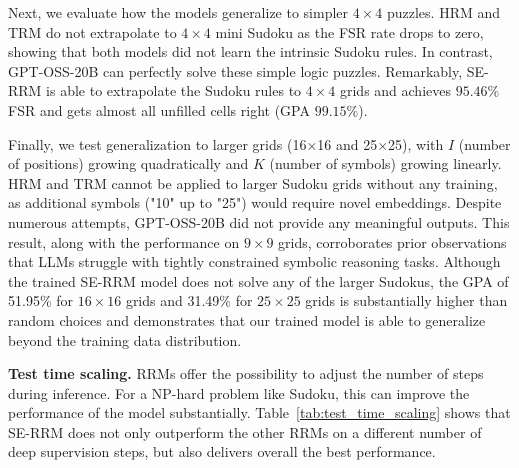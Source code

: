 \documentclass{article}
\theoremstyle{plain}
\theoremstyle{definition}
\theoremstyle{remark}
\renewcommand{\paragraph}[1]{\textbf{#1}\;}
\begin{document}
Next, we evaluate how the models generalize to simpler $4\times 4$ puzzles.
HRM and TRM do not extrapolate to $4\times 4$ mini Sudoku as the FSR rate drops to zero, 
showing that both models did not learn the intrinsic Sudoku rules.
In contrast, GPT-OSS-20B can perfectly solve these simple logic puzzles.
Remarkably, SE-RRM is able to extrapolate the Sudoku rules to $4\times 4$ grids and achieves $95.46\%$ FSR and gets almost all unfilled cells right (GPA $99.15\%$).


Finally, we test generalization to larger grids (16×16 and 25×25), with $I$ (number of positions) growing quadratically and $K$ (number of symbols) growing linearly.
HRM and TRM cannot be applied to larger Sudoku grids without any training, as additional symbols ("10" up to "25") would require novel embeddings.
Despite numerous attempts, GPT-OSS-20B did not provide any meaningful outputs.
This result, along with the performance on $9\times 9$ grids, corroborates prior observations that LLMs struggle with tightly constrained symbolic reasoning tasks.
Although the trained SE-RRM model does not solve any of the larger Sudokus, the GPA of 51.95\% for $16\times 16$ grids and 31.49\% for $25\times25$ grids is substantially higher than random choices and demonstrates that our trained model is able to generalize beyond the training data distribution.

\paragraph{Test time scaling.} RRMs offer the possibility to adjust the number of steps during inference. For a NP-hard problem like Sudoku, this can improve the performance of the model substantially. Table~\ref{tab:test_time_scaling} shows that SE-RRM does not only outperform the other RRMs on a different number of deep supervision steps, but also delivers overall the best performance.

\begin{table}[h]
\centering
\caption{Test-time scaling on $9\times9$ Sudoku. Fully solved rate (FSR in \%) as a function of the number of deep supervision steps at inference.}
\label{tab:test_time_scaling}
\setlength{\tabcolsep}{5pt}
\renewcommand{\arraystretch}{1.15}
\end{table}
\end{document}
